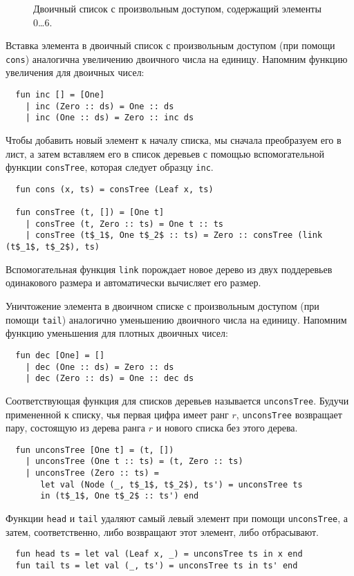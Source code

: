 \begin{frame}[fragile]{}

\begin{figure}
  \centering
  
  \caption{Двоичный список с произвольным доступом, содержащий элементы 0\ldots 6.}
  \label{fig:9.5}
\end{figure}

Вставка элемента в двоичный список с произвольным доступом (при помощи
\lstinline!cons!) аналогична увеличению двоичного числа на
единицу. Напомним функцию увеличения для двоичных чисел:
\begin{lstlisting}
  fun inc [] = [One]
    | inc (Zero :: ds) = One :: ds
    | inc (One :: ds) = Zero :: inc ds
\end{lstlisting}
Чтобы добавить новый элемент к началу списка, мы сначала преобразуем
его в лист, а затем вставляем его в список деревьев с помощью
вспомогательной функции \lstinline!consTree!, которая следует образцу
\lstinline!inc!.
\begin{lstlisting}
  fun cons (x, ts) = consTree (Leaf x, ts)

  fun consTree (t, []) = [One t]
    | consTree (t, Zero :: ts) = One t :: ts
    | consTree (t$_1$, One t$_2$ :: ts) = Zero :: consTree (link (t$_1$, t$_2$), ts)
\end{lstlisting}
Вспомогательная функция \lstinline!link! порождает новое дерево из двух
поддеревьев одинакового размера и автоматически вычисляет его размер.

Уничтожение элемента в двоичном списке с произвольным доступом (при
помощи \lstinline!tail!) аналогично уменьшению двоичного числа на
единицу. Напомним функцию уменьшения для плотных двоичных чисел:
\begin{lstlisting}
  fun dec [One] = []
    | dec (One :: ds) = Zero :: ds
    | dec (Zero :: ds) = One :: dec ds
\end{lstlisting}
Соответствующая функция для списков деревьев называется
\lstinline!unconsTree!. Будучи примененной к списку, чья первая цифра
имеет ранг $r$, \lstinline!unconsTree! возвращает пару, состоящую из
дерева ранга $r$ и нового списка без этого дерева.
\begin{lstlisting}
  fun unconsTree [One t] = (t, [])
    | unconsTree (One t :: ts) = (t, Zero :: ts)
    | unconsTree (Zero :: ts) =
       let val (Node (_, t$_1$, t$_2$), ts') = unconsTree ts
       in (t$_1$, One t$_2$ :: ts') end
\end{lstlisting}
Функции \lstinline!head! и \lstinline!tail!  удаляют самый левый
элемент при помощи \lstinline!unconsTree!, а затем, соответственно,
либо возвращают этот элемент, либо отбрасывают.
\begin{lstlisting}
  fun head ts = let val (Leaf x, _) = unconsTree ts in x end
  fun tail ts = let val (_, ts') = unconsTree ts in ts' end
\end{lstlisting}


\end{frame}

